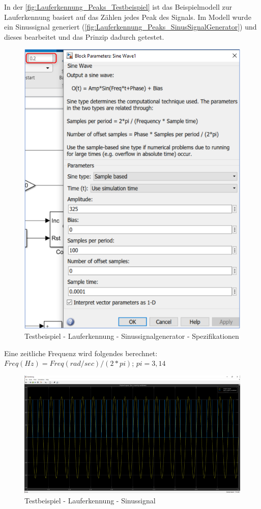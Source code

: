 In der \autoref{fig:Lauferkennung_Peaks_Testbeispiel} ist das Beispielmodell zur Lauferkennung basiert auf das Zählen jedes Peak des Signals. Im Modell wurde ein Sinussignal generiert (\autoref{fig:Lauferkennung_Peaks_SinusSignalGenerator}) und dieses bearbeitet und das Prinzip dadurch getestet.
\begin{figure}[H]
	\centering
	\includegraphics[width=\linewidth]{Bilder/Lauferkennung_Peaks_SinusSignalGenerator.png}
	\caption{Testbeispiel - Lauferkennung - Sinussignalgenerator - Spezifikationen}
	\label{fig:Lauferkennung_Peaks_SinusSignalGenerator}
\end{figure}
Eine zeitliche Frequenz wird folgendes berechnet:
$Freq(Hz) = Freq(rad/sec) / (2 * pi)$; $pi = 3,14$
\begin{figure}[H]
	\centering
	\includegraphics[width=\linewidth]{Bilder/Lauferkennung_Peaks_SinusSignal.png}
	\caption{Testbeispiel - Lauferkennung - Sinussignal}
	\label{fig:Lauferkennung_Peaks_SinusSignal}
\end{figure}
